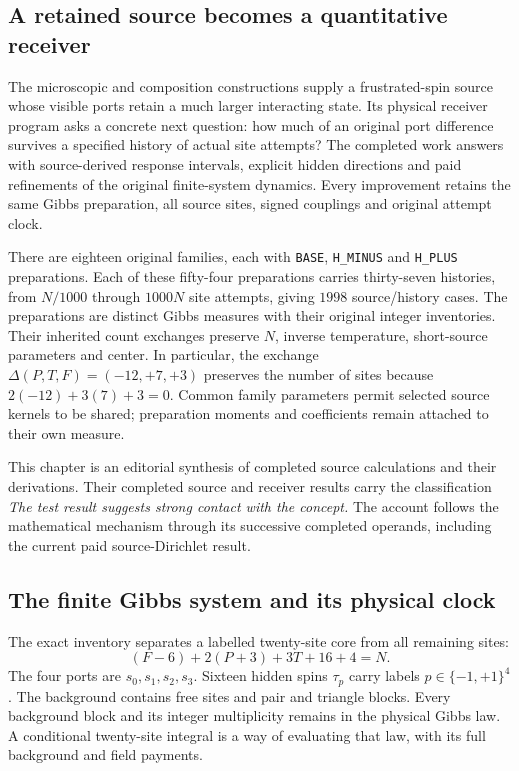 \label{ch:spin-physical}

\subsection{A retained source becomes a quantitative receiver}

The microscopic and composition constructions supply a frustrated-spin source whose visible ports retain a much larger interacting state. Its physical receiver program asks a concrete next question: how much of an original port difference survives a specified history of actual site attempts? The completed work answers with source-derived response intervals, explicit hidden directions and paid refinements of the original finite-system dynamics. Every improvement retains the same Gibbs preparation, all source sites, signed couplings and original attempt clock.

There are eighteen original families, each with \texttt{BASE}, \texttt{H\_MINUS} and \texttt{H\_PLUS} preparations. Each of these fifty-four preparations carries thirty-seven histories, from $N/1000$ through $1000N$ site attempts, giving $1998$ source/history cases. The preparations are distinct Gibbs measures with their original integer inventories. Their inherited count exchanges preserve $N$, inverse temperature, short-source parameters and center. In particular, the exchange $\Delta(P,T,F)=(-12,+7,+3)$ preserves the number of sites because $2(-12)+3(7)+3=0$. Common family parameters permit selected source kernels to be shared; preparation moments and coefficients remain attached to their own measure. 

This chapter is an editorial synthesis of completed source calculations and their derivations. Their completed source and receiver results carry the classification \emph{The test result suggests strong contact with the concept.} The account follows the mathematical mechanism through its successive completed operands, including the current paid source-Dirichlet result.

\subsection{The finite Gibbs system and its physical clock}

The exact inventory separates a labelled twenty-site core from all remaining sites:
\[
 (F-6)+2(P+3)+3T+16+4=N.
\]
The four ports are $s_0,s_1,s_2,s_3$. Sixteen hidden spins $\tau_p$ carry labels $p\in\{-1,+1\}^4$. The background contains free sites and pair and triangle blocks. Every background block and its integer multiplicity remains in the physical Gibbs law. A conditional twenty-site integral is a way of evaluating that law, with its full background and field payments. 

